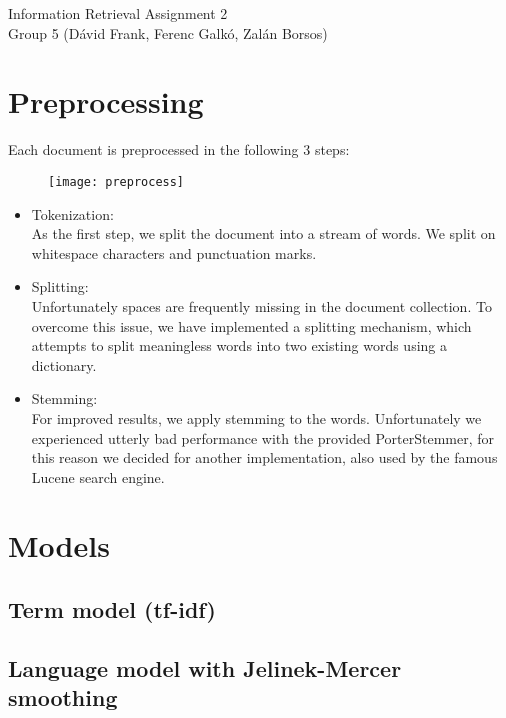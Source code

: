 \documentclass[12pt]{article}
\begin{document}
\begin{center}

{\Huge Information Retrieval Assignment 2} \\
\vspace{.5cm}
{\large Group 5 (Dávid Frank, Ferenc Galkó, Zalán Borsos)}
\end{center}

\vspace{1cm}

\section{Preprocessing}
Each document is preprocessed in the following 3 steps:
\begin{figure}[h]
\centering
\texttt{[image: preprocess]}
\end{figure}

\begin{itemize}
	\item Tokenization: \\
	As the first step, we split the document into a stream of words. We split on whitespace characters and punctuation marks.
	
	\item Splitting: \\
	Unfortunately spaces are frequently missing in the document collection. To overcome this issue, we have implemented a splitting mechanism, which attempts to split meaningless words into two existing words using a dictionary.
	\item Stemming: \\
	For improved results, we apply stemming to the words. Unfortunately we experienced utterly bad performance with the provided PorterStemmer, for this reason we decided for another implementation, also used by the famous Lucene search engine.
	
\end{itemize}


\section{Models}

\subsection{Term model (tf-idf)}


\subsection{Language model with Jelinek-Mercer smoothing}
\end{document}
